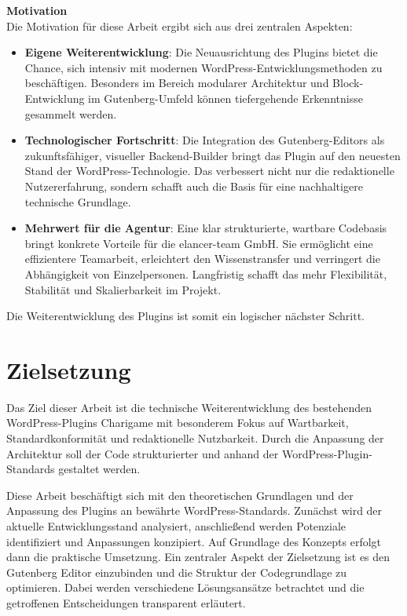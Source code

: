 \textbf{Motivation}\\
Die Motivation für diese Arbeit ergibt sich aus drei zentralen Aspekten:
\begin{itemize}
    \item \textbf{Eigene Weiterentwicklung}: Die Neuausrichtung des Plugins bietet die Chance, sich intensiv mit modernen WordPress-Entwicklungsmethoden zu beschäftigen.
    Besonders im Bereich modularer Architektur und Block-Entwicklung im Gutenberg-Umfeld können tiefergehende Erkenntnisse gesammelt werden.

    \item \textbf{Technologischer Fortschritt}: Die Integration des Gutenberg-Editors als zukunftsfähiger, visueller Backend-Builder bringt das Plugin auf den neuesten Stand der WordPress-Technologie. Das verbessert nicht nur die redaktionelle Nutzererfahrung, sondern schafft auch die Basis für eine nachhaltigere technische Grundlage.

    \item \textbf{Mehrwert für die Agentur}: Eine klar strukturierte, wartbare Codebasis bringt konkrete Vorteile für die elancer-team GmbH. Sie ermöglicht eine effizientere Teamarbeit, erleichtert den Wissenstransfer und verringert die Abhängigkeit von Einzelpersonen. Langfristig schafft das mehr Flexibilität, Stabilität und Skalierbarkeit im Projekt.
\end{itemize}
Die Weiterentwicklung des Plugins ist somit ein logischer nächster Schritt.


\section{Zielsetzung}

Das Ziel dieser Arbeit ist die technische Weiterentwicklung des bestehenden WordPress-Plugins Charigame mit besonderem Fokus auf Wartbarkeit, Standardkonformität und redaktionelle Nutzbarkeit.
Durch die Anpassung der Architektur soll der Code strukturierter und anhand der WordPress-Plugin-Standards gestaltet werden.

Diese Arbeit beschäftigt sich mit den theoretischen Grundlagen und der Anpassung des Plugins an bewährte WordPress-Standards.
Zunächst wird der aktuelle Entwicklungsstand analysiert, anschließend werden Potenziale identifiziert und Anpassungen konzipiert.
Auf Grundlage des Konzepts erfolgt dann die praktische Umsetzung.
Ein zentraler Aspekt der Zielsetzung ist es den Gutenberg Editor einzubinden und die Struktur der Codegrundlage zu optimieren.
Dabei werden verschiedene Lösungsansätze betrachtet und die getroffenen Entscheidungen transparent erläutert.

